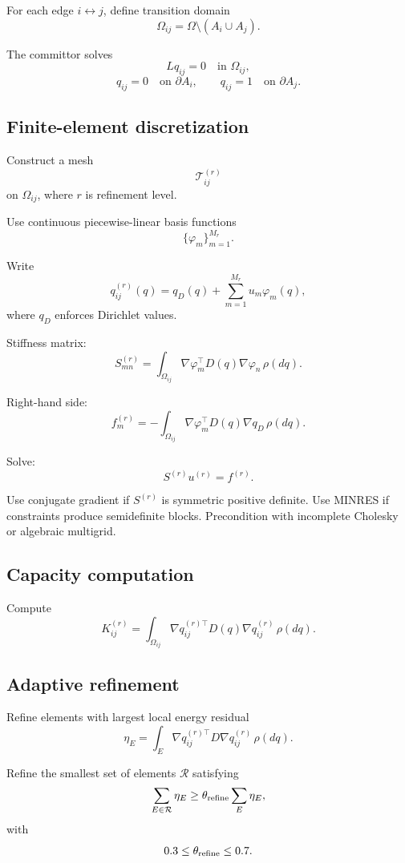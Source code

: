 For each edge \(i\leftrightarrow j\), define transition domain
\[
\Omega_{ij}=\Omega\setminus(A_i\cup A_j).
\]

The committor solves
\[
Lq_{ij}=0
\quad\text{in }\Omega_{ij},
\]
\[
q_{ij}=0\quad\text{on }\partial A_i,
\qquad
q_{ij}=1\quad\text{on }\partial A_j.
\]

\subsection{Finite-element discretization}

Construct a mesh
\[
\mathcal T_{ij}^{(r)}
\]
on \(\Omega_{ij}\), where \(r\) is refinement level.

Use continuous piecewise-linear basis functions
\[
\{\varphi_m\}_{m=1}^{M_r}.
\]

Write
\[
q_{ij}^{(r)}(q)
=
q_D(q)+\sum_{m=1}^{M_r}u_m\varphi_m(q),
\]
where \(q_D\) enforces Dirichlet values.

Stiffness matrix:
\[
S_{mn}^{(r)}
=
\int_{\Omega_{ij}}
\nabla\varphi_m^\top D(q)\nabla\varphi_n\,\rho(dq).
\]

Right-hand side:
\[
f_m^{(r)}
=
-
\int_{\Omega_{ij}}
\nabla\varphi_m^\top D(q)\nabla q_D\,\rho(dq).
\]

Solve:
\[
S^{(r)}u^{(r)}=f^{(r)}.
\]

Use conjugate gradient if \(S^{(r)}\) is symmetric positive definite. Use
MINRES if constraints produce semidefinite blocks. Precondition with incomplete
Cholesky or algebraic multigrid.

\subsection{Capacity computation}

Compute
\[
K_{ij}^{(r)}
=
\int_{\Omega_{ij}}
\nabla q_{ij}^{(r)\top}D(q)\nabla q_{ij}^{(r)}\,\rho(dq).
\]

\subsection{Adaptive refinement}

Refine elements with largest local energy residual
\[
\eta_E
=
\int_E
\nabla q_{ij}^{(r)\top}D\nabla q_{ij}^{(r)}\,\rho(dq).
\]

Refine the smallest set of elements \(\mathcal R\) satisfying
\[
\sum_{E\in\mathcal R}\eta_E
\ge
\theta_{\rm refine}\sum_E\eta_E,
\]
with
\[
0.3\le\theta_{\rm refine}\le0.7.
\]

